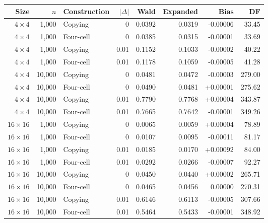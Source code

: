 \begin{tabular}{@{}rrlrrrrr@{}}\toprule
Size & \(n\) & Construction & \(|\Delta|\) & Wald & Expanded & Bias & DF\\\midrule
\(4\times4\) & 1,000 & Copying & 0 & 0.0392 & 0.0319 & -0.00006 & 33.45\\
\(4\times4\) & 1,000 & Four-cell & 0 & 0.0385 & 0.0315 & -0.00001 & 33.69\\
\(4\times4\) & 1,000 & Copying & 0.01 & 0.1152 & 0.1033 & -0.00002 & 40.22\\
\(4\times4\) & 1,000 & Four-cell & 0.01 & 0.1178 & 0.1059 & -0.00005 & 41.28\\
\(4\times4\) & 10,000 & Copying & 0 & 0.0481 & 0.0472 & -0.00003 & 279.00\\
\(4\times4\) & 10,000 & Four-cell & 0 & 0.0490 & 0.0481 & +0.00001 & 275.62\\
\(4\times4\) & 10,000 & Copying & 0.01 & 0.7790 & 0.7768 & +0.00004 & 343.87\\
\(4\times4\) & 10,000 & Four-cell & 0.01 & 0.7665 & 0.7642 & -0.00001 & 349.26\\
\(16\times16\) & 1,000 & Copying & 0 & 0.0065 & 0.0059 & +0.00004 & 78.89\\
\(16\times16\) & 1,000 & Four-cell & 0 & 0.0107 & 0.0095 & -0.00011 & 81.17\\
\(16\times16\) & 1,000 & Copying & 0.01 & 0.0185 & 0.0170 & +0.00092 & 84.00\\
\(16\times16\) & 1,000 & Four-cell & 0.01 & 0.0292 & 0.0266 & -0.00007 & 92.27\\
\(16\times16\) & 10,000 & Copying & 0 & 0.0450 & 0.0440 & +0.00002 & 265.71\\
\(16\times16\) & 10,000 & Four-cell & 0 & 0.0465 & 0.0456 & 0.00000 & 270.31\\
\(16\times16\) & 10,000 & Copying & 0.01 & 0.6146 & 0.6113 & -0.00005 & 307.66\\
\(16\times16\) & 10,000 & Four-cell & 0.01 & 0.5464 & 0.5433 & -0.00001 & 348.92\\
\bottomrule\end{tabular}
